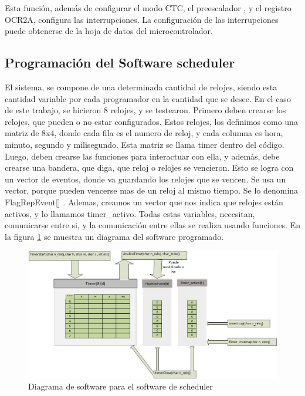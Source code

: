 Esta función, además de configurar el modo CTC, el preescalador , y el registro OCR2A, configura las interrupciones. La configuración de las interrupciones puede obtenerse de la hoja de datos del microcontrolador.

\subsection{Programación del Software scheduler} 

El sistema, se compone de una determinada cantidad de relojes, siendo esta cantidad variable por cada programador en la cantidad que se desee. En el caso de este trabajo, se hicieron 8 relojes, y se testearon.
Primero deben crearse los relojes, que pueden o no estar configurados. Estos relojes, los definimos como una matriz de 8x4, donde cada fila es el numero de reloj, y cada columna es hora, minuto, segundo y milisegundo. Esta matriz se llama timer dentro del código. Luego, deben crearse las funciones para interactuar con ella, y además, debe crearse una bandera, que diga, que reloj o relojes se vencieron. Esto se logra con un vector de eventos, donde va guardando los relojes que se vencen. Se usa un vector, porque pueden vencerse mas de un reloj al mismo tiempo. Se lo denomina FlagRepEvent[] . Ademas, creamos un vector que nos indica que relojes están activos, y lo llamamos timer\_activo. Todas estas variables, necesitan, comunicarse entre si, y la comunicación entre ellas se realiza usando funciones. En la figura \ref{fig:soft_sch} se muestra un diagrama del software programado.  


\begin{figure}[ht]
	\includegraphics[width=\linewidth]{software_timer} 
	\caption{Diagrama de software para el software de scheduler}
	\label{fig:soft_sch} 	
\end{figure}

